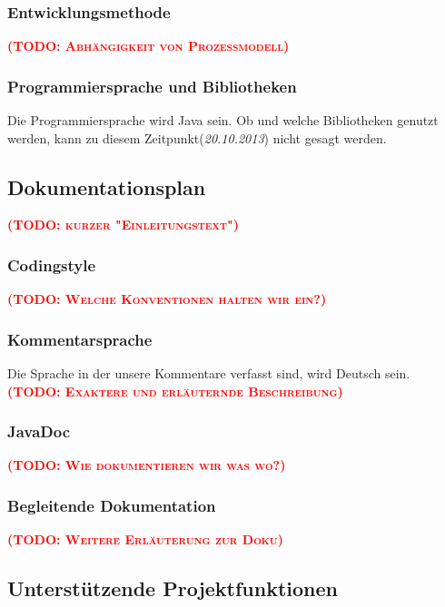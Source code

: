 \documentclass[fontsize=12pt,paper=a4,twoside]{scrartcl}
\newcommand{\todo}[1]{\textbf{\textsc{\textcolor{red}{(TODO: #1)}}}}
\begin{document}
\subsubsection{Entwicklungsmethode}

\todo{Abhängigkeit von Prozessmodell}


\subsubsection{Programmiersprache und Bibliotheken}
Die Programmiersprache wird Java sein. Ob und welche Bibliotheken genutzt werden, kann zu diesem Zeitpunkt(\emph{20.10.2013}) nicht gesagt werden.
\subsection{Dokumentationsplan}
\todo{kurzer "Einleitungstext"}
\subsubsection{Codingstyle}
\todo{Welche Konventionen halten wir ein?}
\subsubsection{Kommentarsprache}
Die Sprache in der unsere Kommentare verfasst sind, wird Deutsch sein.\\
\todo{Exaktere und erläuternde Beschreibung}
\subsubsection{JavaDoc}
\todo{Wie dokumentieren wir was wo?}
\subsubsection{Begleitende Dokumentation}
\todo{Weitere Erläuterung zur Doku}
\subsection{Unterstützende Projektfunktionen}

\end{document}
